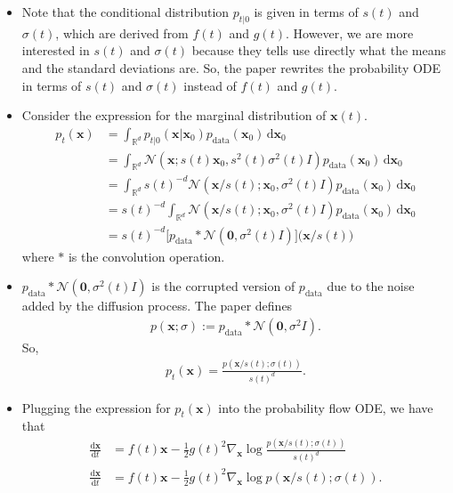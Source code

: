 \documentclass[10pt]{article}
\newcommand{\dee}{\mathrm{d}}
\newcommand{\ve}[1]{\mathbf{#1}}
\newcommand{\mcal}[1]{\mathcal{#1}}
\newcommand{\Real}{\mathbb{R}}
\newcommand{\data}{\mathrm{data}}
\begin{document}
\begin{itemize}
  \item Note that the conditional distribution $p_{t|0}$ is given in terms of $s(t)$ and $\sigma(t)$, which are derived from $f(t)$ and $g(t)$. However, we are more interested in $s(t)$ and $\sigma(t)$ because they tells use directly what the means and the standard deviations are. So, the paper rewrites the probability ODE in terms of $s(t)$ and $\sigma(t)$ instead of $f(t)$ and $g(t)$.

  \item Consider the expression for the marginal distribution of $\ve{x}(t)$.
    \begin{align*}
      p_t(\ve{x}) 
      &= \int_{\Real^d} p_{t|0}(\ve{x}|\ve{x}_0) p_{\data}(\ve{x}_0)\, \dee \ve{x}_0 \\
      &= \int_{\Real^d} \mcal{N}(\ve{x}; s(t)\ve{x}_0, s^2(t)\sigma^2(t) I) p_{\data}(\ve{x}_0)\, \dee \ve{x}_0 \\
      &= \int_{\Real^d} s(t)^{-d} \mcal{N}(\ve{x} / s(t); \ve{x}_0, \sigma^2(t) I) p_{\data}(\ve{x}_0)\, \dee \ve{x}_0 \\
      &= s(t)^{-d}  \int_{\Real^d} \mcal{N}(\ve{x} / s(t); \ve{x}_0, \sigma^2(t) I) p_{\data}(\ve{x}_0)\, \dee \ve{x}_0 \\
      &= s(t)^{-d} \Big[ p_{\data} * \mcal{N}(\ve{0}, \sigma^2(t) I ) \Big] \big( \ve{x} / s(t) \big)
    \end{align*}
    where $*$ is the convolution operation.

  \item $p_{\data} * \mcal{N}(\ve{0}, \sigma^2(t) I )$ is the corrupted version of $p_{\data}$ due to the noise added by the diffusion process. The paper defines
  \begin{align*}
    p(\ve{x}; \sigma) := p_{\data} * \mcal{N}(\ve{0}, \sigma^2 I).
  \end{align*} 
  So,
  \begin{align*}
    p_t(\ve{x}) = \frac{p(\ve{x}/s(t); \sigma(t))}{s(t)^d}.
  \end{align*}

  \item Plugging the expression for $p_t(\ve{x})$ into the probability flow ODE, we have that
  \begin{align*}
    \frac{\dee \ve{x}}{\dee t} &= f(t)\ve{x} - \frac{1}{2}g(t)^2 \nabla_{\ve{x}} \log \frac{p(\ve{x}/s(t); \sigma(t))}{s(t)^d} \\
    \frac{\dee \ve{x}}{\dee t} &= f(t)\ve{x} - \frac{1}{2}g(t)^2 \nabla_{\ve{x}} \log p(\ve{x}/s(t); \sigma(t)).
  \end{align*}
  

\end{itemize}
\end{document}
